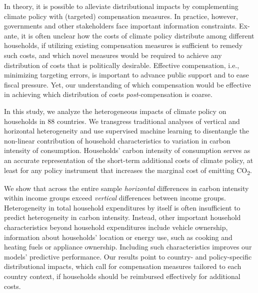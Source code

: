 \documentclass[12pt, a4paper]{article}
\begin{document}
In theory, it is possible to alleviate distributional impacts by complementing climate policy with (targeted) compensation measures. In practice, however, governments and other stakeholders face important information constraints. Ex-ante, it is often unclear how the costs of climate policy distribute among different households, if utilizing existing compensation measures is sufficient to remedy such costs, and which novel measures would be required to achieve any distribution of costs that is politically desirable. Effective compensation, i.e., minimizing targeting errors, is important to advance public support and to ease fiscal pressure. Yet, our understanding of which compensation would be effective in achieving which distribution of costs \textit{post}-compensation is coarse.

In this study, we analyze the heterogeneous impacts of climate policy on households in 88 countries. We transgress traditional analyses of vertical and horizontal heterogeneity and use supervised machine learning to disentangle the non-linear contribution of household characteristics to variation in carbon intensity of consumption. Households' carbon intensity of consumption serves as an accurate representation of the short-term additional costs of climate policy, at least for any policy instrument that increases the marginal cost of emitting CO\textsubscript{2}.

We show that across the entire sample \textit{horizontal} differences in carbon intensity within income groups exceed \textit{vertical} differences between income groups. Heterogeneity in total household expenditures by itself is often insufficient to predict heterogeneity in carbon intensity. Instead, other important household characteristics beyond household expenditures include vehicle ownership, information about households' location or energy use, such as cooking and heating fuels or appliance ownership. Including such characteristics improves our models' predictive performance. Our results point to country- and policy-specific distributional impacts, which call for compensation measures tailored to each country context, if households should be reimbursed effectively for additional costs. 
\end{document}
